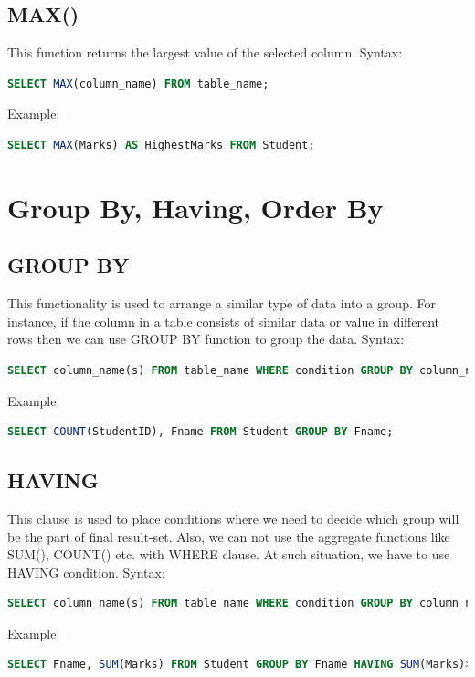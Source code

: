 \section{MAX()}
This function returns the largest value of the selected column.
Syntax:
\begin{lstlisting}[language=sql]
	SELECT MAX(column_name) FROM table_name;
\end{lstlisting}
Example:
\begin{lstlisting}[language=sql]
	SELECT MAX(Marks) AS HighestMarks FROM Student;
\end{lstlisting}


\chapter{Group By, Having, Order By}
\section{GROUP BY}
This functionality is used to arrange a similar type of data into a group. For instance, if the column in a table consists of similar data or value in different rows then we can use GROUP BY function to group the data.
Syntax:
\begin{lstlisting}[language=sql]
	SELECT column_name(s) FROM table_name WHERE condition GROUP BY column_name(s);
\end{lstlisting}
Example:
\begin{lstlisting}[language=sql]
	SELECT COUNT(StudentID), Fname FROM Student GROUP BY Fname;
\end{lstlisting}

\section{HAVING}
This clause is used to place conditions where we need to decide which group will be the part of final result-set. Also, we can not use the aggregate functions like SUM(), COUNT() etc. with WHERE clause. At such situation, we have to use HAVING condition.
Syntax:
\begin{lstlisting}[language=sql]
	SELECT column_name(s) FROM table_name WHERE condition GROUP BY column_name(s) HAVING condition;
\end{lstlisting}
Example:
\begin{lstlisting}[language=sql]
	SELECT Fname, SUM(Marks) FROM Student GROUP BY Fname HAVING SUM(Marks)>500;
\end{lstlisting}

